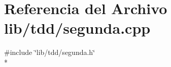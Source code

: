 \section{Referencia del Archivo lib/tdd/segunda.cpp}
\label{segunda_8cpp}
{\ttfamily \#include \char`\"{}lib/tdd/segunda.\+h\char`\"{}}\\*
